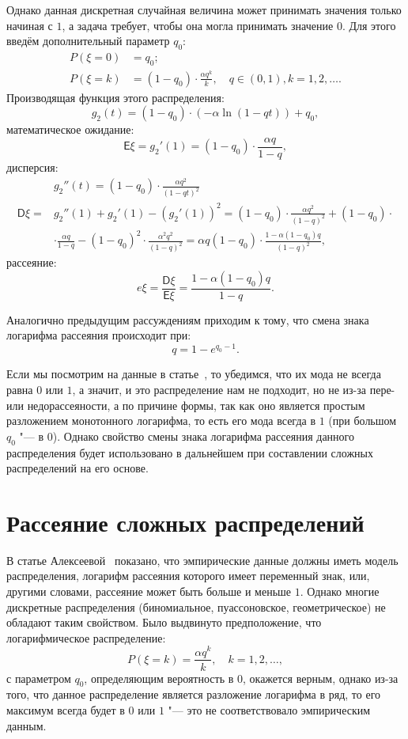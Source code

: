 \documentclass[12pt, specialist, subf, substylefile = spbu_report.rtx]{disser}
\begin{document}
	Однако данная дискретная случайная величина может принимать значения только начиная с $ 1 $, а задача требует, чтобы она могла принимать значение $ 0 $. Для этого введём дополнительный параметр $ q _0 $:
	\[
		\begin{aligned}
			P(\xi = 0) &= q _0;\\
			P(\xi = k) &= (1 - q _0) \cdot \frac {\alpha q ^k} {k},\quad q \in (0, 1), k = 1, 2, \dots.
		\end{aligned}
	\]
	Производящая функция этого распределения:
	\[
		g _2(t) = (1 - q _0) \cdot (- \alpha \ln (1 - qt)) + q _0,
	\]
	математическое ожидание:
	\[
		\mathsf{E} \xi = g _2' (1) = (1 - q _0) \cdot \frac {\alpha q} {1 - q},
	\]
	дисперсия:
	\[
		\begin{aligned}
			&g _2'' (t) = (1 - q _0) \cdot \frac {\alpha q ^2} {(1 - qt) ^2}\\
			\mathsf{D} \xi = &g _2''(1) + g _2'(1) - \left( g _2' (1) 	\right) ^2 = (1 - q _0) \cdot \frac {\alpha q ^2} {(1 - q) ^2} + (1 - q _0) \cdot\\
			&\cdot \frac {\alpha q} {1 - q} - (1 - q _0) ^2 \cdot \frac {\alpha ^2 q ^2} {(1 - q) ^2} = \alpha q (1 - q _0) \cdot \frac {1 - \alpha (1 - q _0)q} {(1 - q) ^2},
		\end{aligned}
	\]
	рассеяние:
	\[
		e\xi = \frac {\mathsf{D} \xi} {\mathsf{E} \xi} = \frac {1 - \alpha (1 - q _0)q} {1 - q}.
	\]
	
	Аналогично предыдущим рассуждениям приходим к тому, что смена знака логарифма рассеяния происходит при:
	\[ 
		q = 1 - e ^{q _0 - 1}.
	\]
	
	Если мы посмотрим на данные в статье~\cite{bib:alexeeva2008}, то убедимся, что их мода не всегда равна $ 0 $ или $ 1 $, а значит, и это распределение нам не подходит, но не из-за пере- или недорассеяности, а по причине формы, так как оно является простым разложением монотонного логарифма, то есть его мода всегда в $ 1 $ (при большом $ q _0 $ "--- в $ 0 $). Однако свойство смены знака логарифма рассеяния данного распределения будет использовано в дальнейшем при составлении сложных распределений на его основе.
	
	\section{Рассеяние сложных распределений}
	
	В статье Алексеевой~\cite{bib:alexeeva2008} показано, что эмпирические данные должны иметь модель распределения, логарифм рассеяния которого имеет переменный знак, или, другими словами, рассеяние может быть больше и меньше $ 1 $. Однако многие дискретные распределения (биномиальное, пуассоновское, геометрическое) не обладают таким свойством. Было выдвинуто предположение, что логарифмическое распределение:
	\[
		P(\xi = k) = \frac {\alpha q ^k} {k},\quad k = 1, 2, \dots,
	\]
	с параметром $ q _0 $, определяющим вероятность в $ 0 $, окажется верным, однако из-за того, что данное распределение является разложение логарифма в ряд, то его максимум всегда будет в $ 0 $ или $ 1 $ "--- это не соответствовало эмпирическим данным.
	
\end{document}
